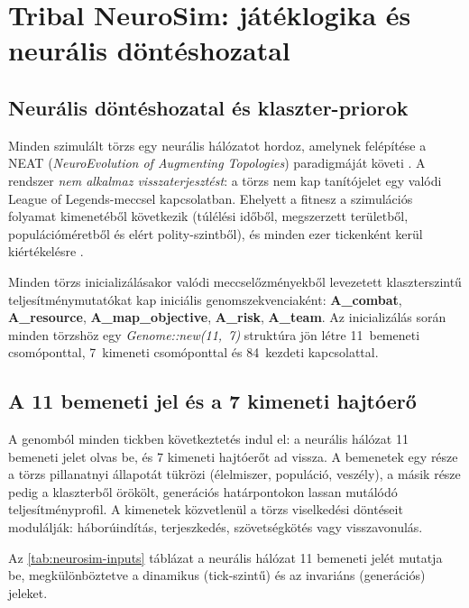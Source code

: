 \chapter{Tribal NeuroSim: játéklogika és neurális döntéshozatal}

\section{Neurális döntéshozatal és klaszter-priorok}

Minden szimulált törzs egy neurális hálózatot hordoz, amelynek felépítése a NEAT (\textit{NeuroEvolution of Augmenting Topologies}) paradigmáját követi \cite{stanleymiikkulainen2002}. A rendszer \textit{nem alkalmaz visszaterjesztést}: a törzs nem kap tanítójelet egy valódi League of Legends-meccsel kapcsolatban. Ehelyett a fitnesz a szimulációs folyamat kimenetéből következik (túlélési időből, megszerzett területből, populációméretből és elért polity-szintből), és minden ezer tickenként kerül kiértékelésre \cite{holland1992}.

Minden törzs inicializálásakor valódi meccselőzményekből levezetett klaszterszintű teljesítménymutatókat kap iniciális genomszekvenciaként: \textbf{A\_combat}, \textbf{A\_resource}, \textbf{A\_map\_objective}, \textbf{A\_risk}, \textbf{A\_team}. Az inicializálás során minden törzshöz egy \textit{Genome::new(11,~7)} struktúra jön létre 11~bemeneti csomóponttal, 7~kimeneti csomóponttal és 84~kezdeti kapcsolattal.

\section{A 11 bemeneti jel és a 7 kimeneti hajtóerő}

A genomból minden tickben következtetés indul el: a neurális hálózat 11 bemeneti jelet olvas be, és 7 kimeneti hajtóerőt ad vissza. A bemenetek egy része a törzs pillanatnyi állapotát tükrözi (élelmiszer, populáció, veszély), a másik része pedig a klaszterből örökölt, generációs határpontokon lassan mutálódó teljesítményprofil. A kimenetek közvetlenül a törzs viselkedési döntéseit modulálják: háborúindítás, terjeszkedés, szövetségkötés vagy visszavonulás.

Az \ref{tab:neurosim-inputs} táblázat a neurális hálózat 11 bemeneti jelét mutatja be, megkülönböztetve a dinamikus (tick-szintű) és az invariáns (generációs) jeleket.

